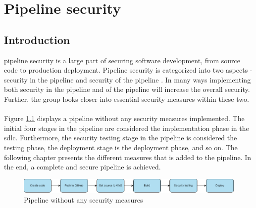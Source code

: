 \newpage
\thispagestyle{empty}
\mbox{}
\chapter{Pipeline security}
\label{Pipeline security}
\section{Introduction}
\gls{pipeline} security is a large part of securing software development, from source code to production deployment. Pipeline security is categorized into two aspects - security in the \gls{pipeline} and security of the \gls{pipeline} \cite{inofpipeline}. In many ways implementing both security in the \gls{pipeline} and of the  \gls{pipeline}  will increase the overall security. Further, the group looks closer into essential security measures within these two. 
\\~\\
Figure \ref{fig: Pipeline without any security measures} displays a \gls{pipeline} without any security measures implemented. The initial four stages in the pipeline are considered the implementation phase in the \acrshort{sdlc}. Furthermore, the security testing stage in the pipeline is considered the testing phase, the deployment stage is the deployment phase, and so on. The following chapter presents the different measures that is added to the pipeline. In the end, a complete and secure pipeline is achieved.

\vspace{2mm}
\begin{figure}[H]
    \centering
    \includegraphics[width=0.8\columnwidth]{Images/SecurePipeline-Page-3.drawio.png}
    \caption{Pipeline without any security measures}
    \label{fig: Pipeline without any security measures}
\end{figure}





